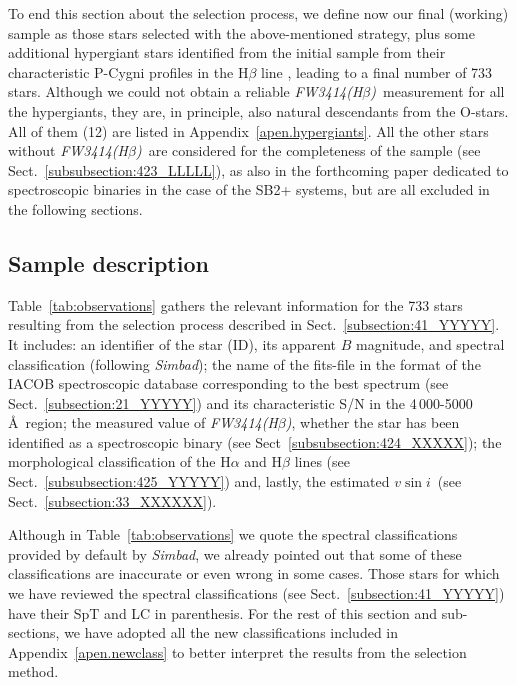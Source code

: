 \documentclass{aa}
\newcommand{\vsini}{\mbox{$v\sin i$}}
\newcommand{\fwhb}{\textit{FW3414(H$\beta$)}}
\begin{document}
To end this section about the selection process, we define now our final (working) sample as those stars selected with the above-mentioned strategy, plus some additional hypergiant stars identified from the initial sample from their characteristic P-Cygni profiles in the H$\beta$ line \citep{1992A&AS...94..569L}, leading to a final number of 733 stars. Although we could not obtain a reliable \fwhb\ measurement for all the hypergiants, they are, in principle, also natural descendants from the O-stars. All of them (12) are listed in Appendix~\ref{apen.hypergiants}. All the other stars without \fwhb\ are considered for the completeness of the sample (see Sect.~\ref{subsubsection:423_LLLLL}), as also in the forthcoming paper dedicated to spectroscopic binaries in the case of the SB2+ systems, but are all excluded in the following sections.




\subsection{Sample description}
\label{subsection:42_YYYYY}

Table~\ref{tab:observations} gathers the relevant information for the 733 stars resulting from the selection process described in Sect.~\ref{subsection:41_YYYYY}. It includes: an identifier of the star (ID), its apparent $B$ magnitude, and spectral classification (following \textit{Simbad}); the name of the fits-file in the format of the IACOB spectroscopic database corresponding to the best spectrum (see Sect.~\ref{subsection:21_YYYYY}) and its characteristic S/N in the 4\,000-5000\,\AA\ region; the measured value of \fwhb, whether the star has been identified as a spectroscopic binary (see Sect~\ref{subsubsection:424_XXXXX}); the morphological classification of the H$\alpha$ and H$\beta$ lines (see Sect.~\ref{subsubsection:425_YYYYY}) and, lastly, the estimated \vsini\ (see Sect.~\ref{subsection:33_XXXXXX}).

Although in Table~\ref{tab:observations} we quote the spectral classifications provided by default by \textit{Simbad}, we already pointed out that some of these classifications are inaccurate or even wrong in some cases. Those stars for which we have reviewed the spectral classifications (see Sect.~\ref{subsection:41_YYYYY}) have their SpT and LC in parenthesis. For the rest of this section and sub-sections, we have adopted all the new classifications included in Appendix~\ref{apen.newclass} to better interpret the results from the selection method.
\end{document}
